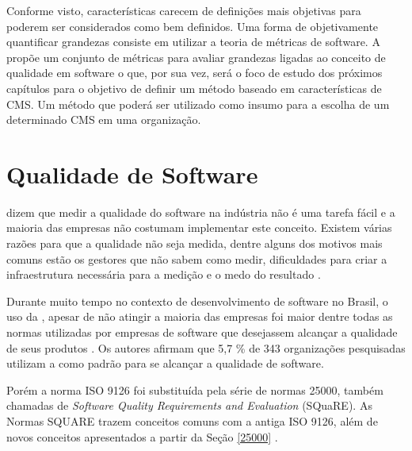 Conforme visto, características carecem de definições mais objetivas para poderem ser considerados como bem definidos. Uma forma de objetivamente quantificar grandezas consiste em utilizar a teoria de métricas de software. A  propõe um conjunto de métricas para avaliar grandezas ligadas ao conceito de qualidade em software o que, por sua vez, será o foco de estudo dos próximos capítulos para o objetivo de definir um método baseado em características de CMS. Um método  que poderá ser utilizado como insumo para a escolha de um determinado CMS em uma organização.

\chapter[Qualidade de Software]{Qualidade de Software}
\label{Qualidade_de_Software}

%

 dizem que medir a qualidade do software na indústria não é uma tarefa fácil e a maioria das empresas não costumam implementar este conceito. Existem várias razões para que a qualidade não seja medida, dentre alguns dos motivos mais comuns estão os gestores que não sabem como medir, dificuldades para criar a infraestrutura necessária para a medição e o medo do resultado  .

Durante muito tempo no contexto de desenvolvimento de software no Brasil, o uso da , apesar de não atingir a maioria das empresas foi maior dentre todas as normas utilizadas por empresas de software que desejassem alcançar a qualidade de seus produtos \cite{Marinho}. Os autores afirmam que 5,7 \% de 343 organizações pesquisadas utilizam a  como padrão para se alcançar a qualidade de software.

Porém a norma ISO 9126 foi substituída pela série de normas 25000, também chamadas de \textit{Software Quality Requirements and Evaluation} (SQuaRE). As Normas SQUARE trazem conceitos comuns com a antiga ISO 9126, além de novos conceitos apresentados a partir da Seção \ref{25000} \cite{iso_25010}.


